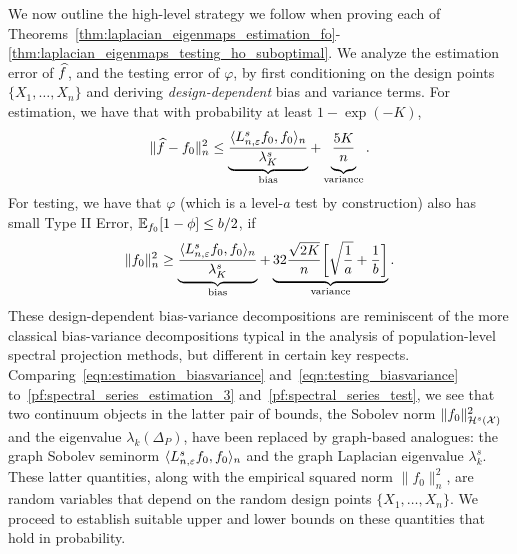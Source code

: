 We now outline the high-level strategy we follow when proving each of Theorems~\ref{thm:laplacian_eigenmaps_estimation_fo}-\ref{thm:laplacian_eigenmaps_testing_ho_suboptimal}. We analyze the estimation error of $\widehat{f}$, and the testing error of $\varphi$, by first conditioning on the design points $\{X_1,\ldots,X_n\}$ and deriving \emph{design-dependent} bias and variance terms. For estimation, we have that with probability at least $1 - \exp(-K)$,
\begin{equation}
\label{eqn:estimation_biasvariance}
\|\wh{f} - f_0\|_n^2 \leq \underbrace{\frac{\dotp{L_{n,\varepsilon}^s f_0}{f_0}_n}{\lambda_{K}^s}}_{\textrm{bias}} + \underbrace{\frac{5K}{n} \vphantom{\frac{\dotp{L^s f_0}{f_0}_n}{\lambda_{K}^s}}}_{\textrm{variance}}.
\end{equation}
For testing, we have that $\varphi$ (which is a level-$a$ test by construction) also has small Type II Error, $\mathbb{E}_{f_0}[1 - \phi] \leq b/2$, if 
\begin{equation}
\label{eqn:testing_biasvariance}
\|f_0\|_n^2 \geq  \underbrace{\frac{\langle L_{n,\varepsilon}^s f_0, f_0 \rangle_n}{\lambda_{K}^s}}_{\textrm{bias}} + \underbrace{32\frac{\sqrt{2K}}{n}\biggl[\sqrt{\frac{1}{a}} + \frac{1}{b}\biggr]}_{\textrm{variance}}.
\end{equation}
These design-dependent bias-variance decompositions are reminiscent of the more classical bias-variance decompositions typical in the analysis of population-level spectral projection methods, but different in certain key respects. Comparing~\eqref{eqn:estimation_biasvariance} and~\eqref{eqn:testing_biasvariance} to~\eqref{pf:spectral_series_estimation_3} and~\eqref{pf:spectral_series_test}, we see that two continuum objects in the latter pair of bounds, the Sobolev norm $\|f_0\|_{\mathcal{H}^s(\mathcal{X})}^2$ and the eigenvalue $\lambda_k(\Delta_P)$, have been replaced by graph-based analogues: the graph Sobolev seminorm $\langle L_{n,\varepsilon}^sf_0, f_0 \rangle_n$ and the graph Laplacian eigenvalue $\lambda_k^s$. These latter quantities, along with the empirical squared norm $\|f_0\|_n^2$, are random variables that depend on the random design points $\{X_1,\ldots,X_n\}$. We proceed to establish suitable upper and lower bounds on these quantities that hold in probability. 

